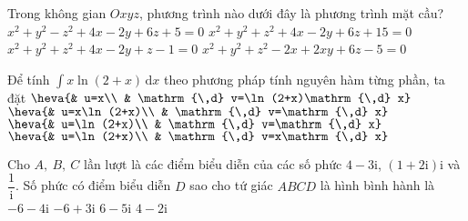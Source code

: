 \begin{ex}%
Trong không gian $Oxyz$, phương trình nào dưới đây là phương trình mặt cầu?
\choice
{$x^2+y^2-z^2+4x-2y+6z+5=0$}
{$x^2+y^2+z^2+4x-2y+6z+15=0$}
{\True $x^2+y^2+z^2+4x-2y+z-1=0$}
{$x^2+y^2+z^2-2x+2xy+6z-5=0$}
\end{ex}


\begin{ex}%
Để tính $\displaystyle\int x\ln (2+x)\mathrm{\,d} x$ theo phương pháp tính nguyên hàm từng phần, ta đặt
\choice
{$\heva{& u=x\\ & \mathrm{\,d} v=\ln(2+x)\mathrm{\,d} x}$}
{$\heva{& u=x\ln(2+x)\\ & \mathrm{\,d} v=\mathrm{\,d} x}$}
{$\heva{& u=\ln(2+x)\\ & \mathrm{\,d} v=\mathrm{\,d} x}$}
{\True $\heva{& u=\ln(2+x)\\ & \mathrm{\,d} v=x\mathrm{\,d} x}$}
\end{ex}


\begin{ex}%
Cho $A,\ B,\ C$ lần lượt là các điểm biểu diễn của các số phức $4-3\mathrm{i}$, $(1+2\mathrm{i})\mathrm{i}$ và $\dfrac{1}{\mathrm{i}}$. Số phức có điểm biểu diễn $D$ sao cho tứ giác $ABCD$ là hình bình hành là
\choice
{$-6-4\mathrm{i}$}
{$-6+3\mathrm{i}$}
{\True $6-5\mathrm{i}$}
{$4-2\mathrm{i}$}
\end{ex}



